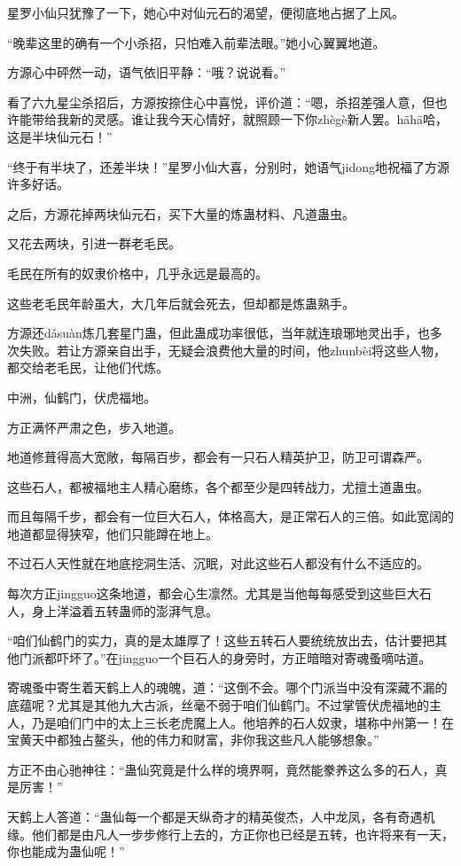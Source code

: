 \begin{this_body}
星罗小仙只犹豫了一下，她心中对仙元石的渴望，便彻底地占据了上风。

“晚辈这里的确有一个小杀招，只怕难入前辈法眼。”她小心翼翼地道。

方源心中砰然一动，语气依旧平静：“哦？说说看。”

看了六九星尘杀招后，方源按捺住心中喜悦，评价道：“嗯，杀招差强人意，但也许能带给我新的灵感。谁让我今天心情好，就照顾一下你zhègè新人罢。hāhā哈，这是半块仙元石！”

“终于有半块了，还差半块！”星罗小仙大喜，分别时，她语气jidong地祝福了方源许多好话。

之后，方源花掉两块仙元石，买下大量的炼蛊材料、凡道蛊虫。

又花去两块，引进一群老毛民。

毛民在所有的奴隶价格中，几乎永远是最高的。

这些老毛民年龄虽大，大几年后就会死去，但却都是炼蛊熟手。

方源还dǎsuàn炼几套星门蛊，但此蛊成功率很低，当年就连琅琊地灵出手，也多次失败。若让方源亲自出手，无疑会浪费他大量的时间，他zhunbèi将这些人物，都交给老毛民，让他们代炼。

中洲，仙鹤门，伏虎福地。

方正满怀严肃之色，步入地道。

地道修葺得高大宽敞，每隔百步，都会有一只石人精英护卫，防卫可谓森严。

这些石人，都被福地主人精心磨练，各个都至少是四转战力，尤擅土道蛊虫。

而且每隔千步，都会有一位巨大石人，体格高大，是正常石人的三倍。如此宽阔的地道都显得狭窄，他们只能蹲在地上。

不过石人天性就在地底挖洞生活、沉眠，对此这些石人都没有什么不适应的。

每次方正jingguo这条地道，都会心生凛然。尤其是当他每每感受到这些巨大石人，身上洋溢着五转蛊师的澎湃气息。

“咱们仙鹤门的实力，真的是太雄厚了！这些五转石人要统统放出去，估计要把其他门派都吓坏了。”在jingguo一个巨石人的身旁时，方正暗暗对寄魂蚤嘀咕道。

寄魂蚤中寄生着天鹤上人的魂魄，道：“这倒不会。哪个门派当中没有深藏不漏的底蕴呢？尤其是其他九大古派，丝毫不弱于咱们仙鹤门。不过掌管伏虎福地的主人，乃是咱们门中的太上三长老虎魔上人。他培养的石人奴隶，堪称中州第一！在宝黄天中都独占鳌头，他的伟力和财富，非你我这些凡人能够想象。”

方正不由心驰神往：“蛊仙究竟是什么样的境界啊，竟然能豢养这么多的石人，真是厉害！”

天鹤上人答道：“蛊仙每一个都是天纵奇才的精英俊杰，人中龙凤，各有奇遇机缘。他们都是由凡人一步步修行上去的，方正你也已经是五转，也许将来有一天，你也能成为蛊仙呢！”


\end{this_body}
